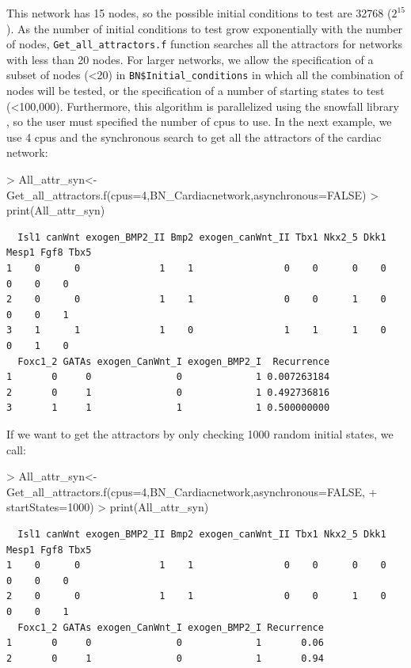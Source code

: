 \documentclass[a4paper]{article}
\begin{document}
This network has 15 nodes, so the possible initial conditions to test are 32768 ($2^{15}$). As the number of initial conditions to test grow exponentially with the number of nodes, \texttt{Get\_all\_attractors.f} function searches all the attractors for networks with less than 20 nodes. For larger networks, we allow the specification of a subset of nodes (<20) in \texttt{BN\$Initial\_conditions} in which all the combination of nodes will be tested, or the specification of a number of starting states to test (<100,000). Furthermore, this algorithm is parallelized using the snowfall library \cite{Knaus2013-py}, so the user must specified the number of cpus to use. In the next example, we use 4 cpus and the synchronous search to get all the attractors of the cardiac network:

\begin{Schunk}
\begin{Sinput}
> All_attr_syn<-Get_all_attractors.f(cpus=4,BN_Cardiacnetwork,asynchronous=FALSE)
> print(All_attr_syn)
\end{Sinput}
\end{Schunk}
\begin{verbatim}
  Isl1 canWnt exogen_BMP2_II Bmp2 exogen_canWnt_II Tbx1 Nkx2_5 Dkk1 Mesp1 Fgf8 Tbx5
1    0      0              1    1                0    0      0    0     0    0    0
2    0      0              1    1                0    0      1    0     0    0    1
3    1      1              1    0                1    1      1    0     0    1    0
  Foxc1_2 GATAs exogen_CanWnt_I exogen_BMP2_I  Recurrence
1       0     0               0             1 0.007263184
2       0     1               0             1 0.492736816
3       1     1               1             1 0.500000000
\end{verbatim}

If we want to get the attractors by only checking 1000 random initial states, we call:

\begin{Schunk}
\begin{Sinput}
> All_attr_syn<-Get_all_attractors.f(cpus=4,BN_Cardiacnetwork,asynchronous=FALSE,
+                                    startStates=1000)
> print(All_attr_syn)
\end{Sinput}
\end{Schunk}
\begin{verbatim}
  Isl1 canWnt exogen_BMP2_II Bmp2 exogen_canWnt_II Tbx1 Nkx2_5 Dkk1 Mesp1 Fgf8 Tbx5
1    0      0              1    1                0    0      0    0     0    0    0
2    0      0              1    1                0    0      1    0     0    0    1
  Foxc1_2 GATAs exogen_CanWnt_I exogen_BMP2_I Recurrence
1       0     0               0             1       0.06
2       0     1               0             1       0.94
\end{verbatim}
\end{document}
